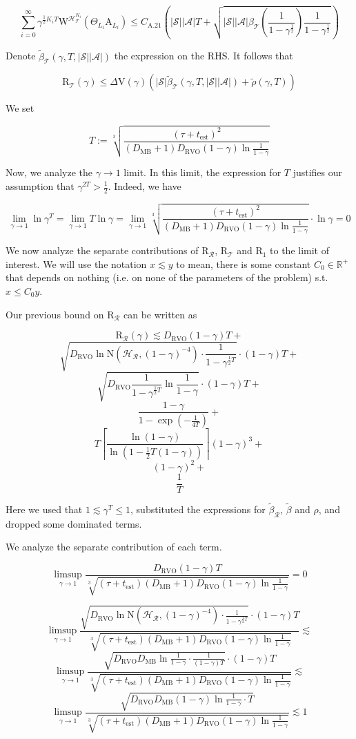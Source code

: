 \documentclass[a4paper]{article}
\newcommand{\AP}[1]{\left(#1\right)}
\newcommand{\Abs}[1]{\left\vert #1 \right\vert}
\newcommand{\Ceil}[1]{\left\lceil #1 \right\rceil}
\newcommand{\Reals}{\mathbb{R}}
\newcommand{\St}{\mathcal{S}}
\newcommand{\A}{\mathcal{A}}
\newcommand{\R}{\mathcal{R}}
\newcommand{\T}{\mathcal{T}}
\newcommand{\Hy}{\mathcal{H}}
\newcommand{\DRVO}{D_{\mathrm{RVO}}}
\newcommand{\DMB}{D_{\mathrm{MB}}}
\newcommand{\Est}{\mathrm{est}}
\newcommand{\V}{\mathrm{V}}
\newcommand{\Reg}{\mathrm{R}}
\newcommand{\AT}{\mathrm{A}}
\newcommand{\N}{\mathrm{N}}
\newcommand{\W}{\mathrm{W}}
\begin{document}
$$\sum_{i=0}^\infty\gamma^{\frac{1}{2}K_i T}\W^{\Hy_\T^{K_i}}\AP{\Theta_{L_i}\AT_{L_i}}\leq C_{\text{A.21}}\AP{\Abs{\St}\Abs{\A} T+\sqrt{\Abs{\St}\Abs{\A}\beta_\T\AP{\frac{1}{1-\gamma^{\frac{1}{2}}}}\frac{1}{1-\gamma^{\frac{1}{2}}}}}$$

Denote $\tilde{\beta}_\T\AP{\gamma,T,\Abs{\St}\Abs{\A}}$ the expression on the RHS. It follows that

$$\Reg_\T(\gamma)\leq\Delta\V(\gamma)\AP{\Abs{\St}\tilde{\beta}_\T\AP{\gamma,T,\Abs{\St}\Abs{\A}}+\tilde{\rho}(\gamma,T)}$$

We set

$$T:=\sqrt[3]{\frac{\AP{\tau+t_\Est}^2}{\AP{\DMB+1}\DRVO(1-\gamma)\ln\frac{1}{1-\gamma}}}$$

Now, we analyze the $\gamma\rightarrow1$ limit. In this limit, the expression for $T$ justifies our assumption that $\gamma^{2T}>\frac{1}{2}$. Indeed, we have

$$\lim_{\gamma\rightarrow1}\ln{\gamma^T}=\lim_{\gamma\rightarrow1}T\ln\gamma=\lim_{\gamma\rightarrow1}\sqrt[3]{\frac{\AP{\tau+t_\Est}^2}{\AP{\DMB+1}\DRVO(1-\gamma)\ln\frac{1}{1-\gamma}}}\cdot\ln\gamma=0$$

We now analyze the separate contributions of $\Reg_\R$, $\Reg_\T$ and $\Reg_1$ to the limit of interest. We will use the notation $x\lesssim y$ to mean, there is some constant $C_0\in\Reals^+$ that depends on nothing (i.e. on none of the parameters of the problem) s.t. $x\leq C_0y$.

Our previous bound on $\Reg_\R$ can be written as

$$\Reg_\R(\gamma)\lesssim \DRVO(1-\gamma)T+$$
$$\sqrt{\DRVO\ln\N\AP{\Hy_\R,(1-\gamma)^{-4}}\cdot\frac{1}{1-\gamma^{\frac{1}{2}T}}}\cdot(1-\gamma)T+$$
$$\sqrt{\DRVO\frac{1}{1-\gamma^{\frac{1}{2}T}}\ln\frac{1}{1-\gamma}}\cdot(1-\gamma)T+$$
$$\frac{1-\gamma}{1-\exp\AP{-\frac{1}{4T}}}+$$
$$T\Ceil{\frac{\ln(1-\gamma)}{\ln\AP{1-\frac{1}{2}T(1-\gamma)}}}(1-\gamma)^3+$$
$$(1-\gamma)^2+$$
$$\frac{1}{T}$$

Here we used that $1\lesssim\gamma^T\leq1$, substituted the expressions for $\tilde{\beta}_\R$, $\tilde{\beta}$ and $\rho$, and dropped some dominated terms.

We analyze the separate contribution of each term.

$$\limsup_{\gamma \rightarrow 1}\frac{\DRVO(1-\gamma)T}{\sqrt[3]{\AP{\tau+t_{\Est}}\AP{\DMB+1}\DRVO(1-\gamma)\ln{\frac{1}{1-\gamma}}}}=0$$

$$\limsup_{\gamma \rightarrow 1}\frac{\sqrt{\DRVO\ln\N\AP{\Hy_\R,(1-\gamma)^{-4}}\cdot\frac{1}{1-\gamma^{\frac{1}{2}T}}}\cdot(1-\gamma)T}{\sqrt[3]{\AP{\tau+t_{\Est}}\AP{\DMB+1}\DRVO(1-\gamma)\ln{\frac{1}{1-\gamma}}}}\lesssim$$
$$\limsup_{\gamma \rightarrow 1}\frac{\sqrt{\DRVO\DMB\ln\frac{1}{1-\gamma}\cdot\frac{1}{(1-\gamma)T}}\cdot(1-\gamma)T}{\sqrt[3]{\AP{\tau+t_{\Est}}\AP{\DMB+1}\DRVO(1-\gamma)\ln{\frac{1}{1-\gamma}}}}\lesssim$$
$$\limsup_{\gamma \rightarrow 1}\frac{\sqrt{\DRVO\DMB(1-\gamma)\ln\frac{1}{1-\gamma}\cdot T}}{\sqrt[3]{\AP{\tau+t_{\Est}}\AP{\DMB+1}\DRVO(1-\gamma)\ln{\frac{1}{1-\gamma}}}}\lesssim1$$
\end{document}
